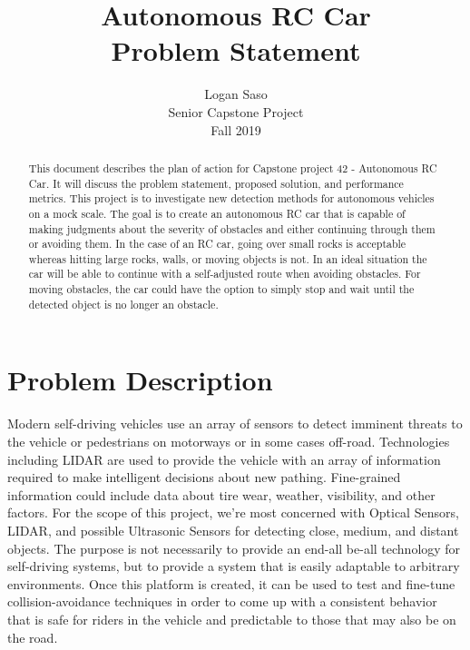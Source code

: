 \documentclass[journal,draftclsnofoot,onecolumn]{IEEEtran}
\begin{document}
%
\title{Autonomous RC Car\\Problem Statement}

\author{Logan Saso\\Senior Capstone Project\\Fall 2019}


\maketitle

\begin{abstract}

This document describes the plan of action for Capstone project 42 - Autonomous RC Car. It will discuss the problem statement, proposed solution, and performance metrics. This project is to investigate new detection methods for autonomous vehicles on a mock scale. The goal is to create an autonomous RC car that is capable of making judgments about the severity of obstacles and either continuing through them or avoiding them. In the case of an RC car, going over small rocks is acceptable whereas hitting large rocks, walls, or moving objects is not. In an ideal situation the car will be able to continue with a self-adjusted route when avoiding obstacles. For moving obstacles, the car could have the option to simply stop and wait until the detected object is no longer an obstacle.

\end{abstract}


\section{Problem Description}

Modern self-driving vehicles use an array of sensors to detect imminent threats to the vehicle or pedestrians on motorways or in some cases off-road. Technologies including LIDAR are used to provide the vehicle with an array of information required to make intelligent decisions about new pathing. Fine-grained information could include data about tire wear, weather, visibility, and other factors. For the scope of this project, we're most concerned with Optical Sensors, LIDAR, and possible Ultrasonic Sensors for detecting close, medium, and distant objects. The purpose is not necessarily to provide an end-all be-all technology for self-driving systems, but to provide a system that is easily adaptable to arbitrary environments. Once this platform is created, it can be used to test and fine-tune collision-avoidance techniques in order to come up with a consistent behavior that is safe for riders in the vehicle and predictable to those that may also be on the road. 
\end{document}

